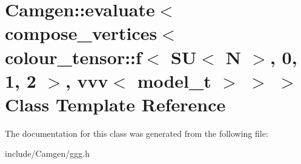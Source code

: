 \hypertarget{a00171}{}\section{Camgen\+:\+:evaluate$<$ compose\+\_\+vertices$<$ colour\+\_\+tensor\+:\+:f$<$ S\+U$<$ N $>$, 0, 1, 2 $>$, vvv$<$ model\+\_\+t $>$ $>$ $>$ Class Template Reference}
\label{a00171}


The documentation for this class was generated from the following file\+:\begin{DoxyCompactItemize}
\item 
include/\+Camgen/ggg.\+h\end{DoxyCompactItemize}
